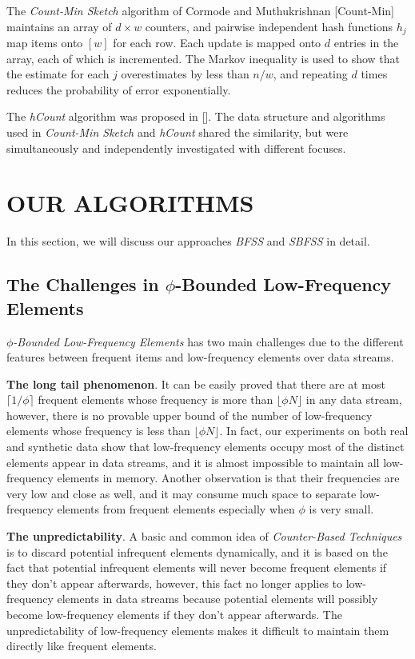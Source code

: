 \documentclass[conference]{IEEEtran}
\begin{document}
The \emph{Count-Min Sketch} algorithm of Cormode and Muthukrishnan [Count-Min] maintains an array of $d\times w$ counters, and pairwise independent hash functions $h_j$ map items onto $[w]$ for each row. Each update is mapped onto $d$ entries in the array, each of which is incremented. The Markov inequality is used to show that the estimate for each $j$ overestimates by less than $n/w$, and repeating $d$ times reduces the probability of error exponentially.\par

The \emph{hCount} algorithm was proposed in []. The data structure and algorithms used in \emph{Count-Min Sketch} and \emph{hCount} shared the similarity, but were simultaneously and independently investigated with different focuses.

\section{OUR ALGORITHMS}
In this section, we will discuss our approaches \emph{BFSS} and \emph{SBFSS} in detail.
\subsection{The Challenges in $\phi$-Bounded Low-Frequency Elements}
$\phi$\emph{-Bounded Low-Frequency Elements} has two main challenges due to the different features between frequent items and low-frequency elements over data streams.\par

\textbf{The long tail phenomenon}. It can be easily proved that there are at most $\lceil1/\phi\rceil$ frequent elements whose frequency is more than $\lfloor\phi N\rfloor$ in any data stream, however, there is no provable upper bound of the number of low-frequency elements whose frequency is less than $\lfloor\phi N\rfloor$. In fact, our experiments on both real and synthetic data show that low-frequency elements occupy most of the distinct elements appear in data streams, and it is almost impossible to maintain all low-frequency elements in memory. Another observation is that their frequencies are very low and close as well, and it may consume much space to separate low-frequency elements from frequent elements especially when $\phi$ is very small.\par

\textbf{The unpredictability}. A basic and common idea of \emph{Counter-Based Techniques} is to discard potential infrequent elements dynamically, and it is based on the fact that potential infrequent elements will never become frequent elements if they don't appear afterwards, however, this fact no longer applies to low-frequency elements in data streams because potential elements will possibly become low-frequency elements if they don't appear afterwards. The unpredictability of low-frequency elements makes it difficult to maintain them directly like frequent elements.
\end{document}
